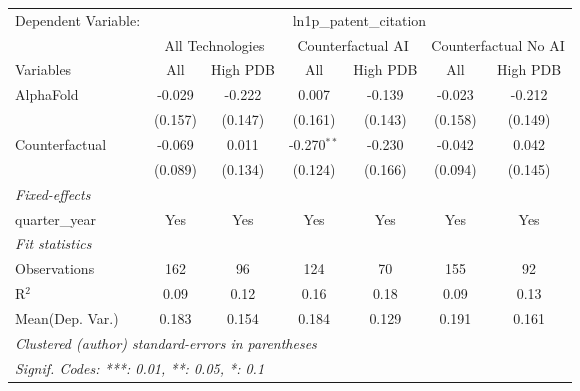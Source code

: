 \begingroup
\centering
\begin{tabular}{lcccccc}
   \tabularnewline \midrule \midrule
   Dependent Variable: & \multicolumn{6}{c}{ln1p\_patent\_citation}\\
 & \multicolumn{2}{c}{All Technologies} & \multicolumn{2}{c}{Counterfactual AI} & \multicolumn{2}{c}{Counterfactual No AI} \\
\cmidrule(lr){1-1}\cmidrule(lr){2-3} \cmidrule(lr){4-5} \cmidrule(lr){6-7}
Variables & \multicolumn{1}{c}{All} & \multicolumn{1}{c}{High PDB} & \multicolumn{1}{c}{All} & \multicolumn{1}{c}{High PDB} & \multicolumn{1}{c}{All} & \multicolumn{1}{c}{High PDB} \\
\cmidrule(lr){1-1}\cmidrule(lr){2-2} \cmidrule(lr){3-3} \cmidrule(lr){4-4} \cmidrule(lr){5-5} \cmidrule(lr){6-6} \cmidrule(lr){7-7}
   AlphaFold      & -0.029  & -0.222  & 0.007         & -0.139  & -0.023  & -0.212\\   
                  & (0.157) & (0.147) & (0.161)       & (0.143) & (0.158) & (0.149)\\   
   Counterfactual & -0.069  & 0.011   & -0.270$^{**}$ & -0.230  & -0.042  & 0.042\\   
                  & (0.089) & (0.134) & (0.124)       & (0.166) & (0.094) & (0.145)\\   
   \midrule
   \emph{Fixed-effects}\\
   quarter\_year  & Yes     & Yes     & Yes           & Yes     & Yes     & Yes\\  
   \midrule
   \emph{Fit statistics}\\
   Observations   & 162     & 96      & 124           & 70      & 155     & 92\\  
   R$^2$          & 0.09    & 0.12    & 0.16          & 0.18    & 0.09    & 0.13\\  
Mean(Dep. Var.) & 0.183 & 0.154 & 0.184 & 0.129 & 0.191 & 0.161 \\
   \midrule \midrule
   \multicolumn{7}{l}{\emph{Clustered (author) standard-errors in parentheses}}\\
   \multicolumn{7}{l}{\emph{Signif. Codes: ***: 0.01, **: 0.05, *: 0.1}}\\
\end{tabular}
\par\endgroup
